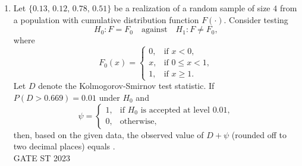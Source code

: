 \documentclass[journal]{IEEEtran}
\begin{document}
\begin{enumerate}[label=\textbf{Q.\arabic*.}, start=1, align=left, itemsep=2em]
\begin{enumerate}[label=\textbf{Q.\arabic*.}, start=11, align=left, itemsep=2em]
\item Let $\{0.13,\, 0.12,\, 0.78,\, 0.51\}$ be a realization of a random sample of size $4$ from a population with cumulative distribution function $F(\cdot)$. Consider testing  
\[
H_0: F = F_0 \quad \text{against} \quad H_1: F \neq F_0,
\]
where  
\[
F_0(x) =
\begin{cases}
0, & \text{if } x < 0, \\
x, & \text{if } 0 \le x < 1, \\
1, & \text{if } x \ge 1.
\end{cases}
\]
Let $D$ denote the Kolmogorov-Smirnov test statistic. If $P(D > 0.669) = 0.01$ under $H_0$ and  
\[
\psi =
\begin{cases}
1, & \text{if $H_0$ is accepted at level $0.01$}, \\
0, & \text{otherwise},
\end{cases}
\]
then, based on the given data, the observed value of $D + \psi$ (rounded off to two decimal places) equals \underline{\hspace{2cm}}.\\
\hspace*{15.7cm}GATE ST 2023

\end{enumerate}
\end{enumerate} 
\end{document}
